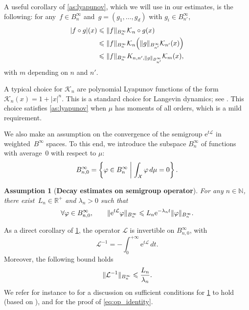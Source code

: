\documentclass[11pt]{article}
\newcommand{\R}{\mathbb{R}}
\newcommand{\N}{\mathbb{N}}
\newcommand{\e}{\mathrm{e}}
\renewcommand{\L}{\mathcal{L}}
\renewcommand{\leq}{\leqslant}
\DeclarePairedDelimiter\norm{\lVert}{\rVert}
\DeclarePairedDelimiter\paren{\lparen}{\rparen}
\newtheorem{assumption}{Assumption}
\theoremstyle{definition}
\newcommand{\Binfz}{B_{n,0}^{\infty}}
\begin{document}
A useful corollary of \cref{as:lyapunov}, which we will use in our estimates, is the following: for any~$f\in B^\infty_{n}$ and~$g = (g_1,\dotsc,g_d)$ with $g_i \in B^\infty_{n'}$, 
\begin{align}
\notag
	|f\circ g|(x) &\leq \|f\|_{B_{n}^\infty}\mathcal{K}_{n} \circ g(x) \\
	\notag
    &\leq \|f\|_{B_{n}^\infty}\mathcal{K}_{n}\paren*{\|g\|_{B^\infty_{n'}} \mathcal{K}_{n'}(x)} \\
    &\leq \norm{f}_{B^\infty_n}K_{n,n',\|g\|_{B^\infty_{n'}}}\mathcal{K}_{m}(x),
	\label{eq:lyap_composition_cor}
\end{align}
with $m$ depending on $n$ and $n'$.

A typical choice for $\mathcal{K}_n$ are polynomial Lyapunov functions of the form $\mathcal{K}_n(x) = 1+|x|^n$. This is a standard choice for Langevin dynamics; see \cite{mattingly2002,talay2002}. This choice satisfies \cref{as:lyapunov} when $\mu$ has moments of all orders, which is a mild requirement.

We also make an assumption on the convergence of the semigroup $\e^{t\L}$ in weighted~$B^\infty$ spaces. To this end, we introduce the subspace $B^\infty_n$ of functions with average~0 with respect to $\mu$:
\begin{equation}
\notag
    \Binfz = \left\{\varphi \in B^\infty_n \; \middle| \; \int_\mathcal{X} \varphi \, d\mu = 0\right\}.
\end{equation}

\begin{assumption}[{\bf Decay estimates on semigroup operator}]
  \label{as:decay_semigroup}
  For any $n\in\N$, there exist~$L_n \in \R^+$ and $\lambda_n>0$ such that
  \begin{equation}
    \forall \varphi\in \Binfz, \qquad \|\e^{t\L}\varphi\|_{B^\infty_n} \leq L_n\e^{-\lambda_n t}\norm{\varphi}_{B^\infty_n}.
    \label{eq:decay}
  \end{equation}
\end{assumption}

As a direct corollary of \cref{as:decay_semigroup}, the operator $\L$ is invertible on $\Binfz$, with
\begin{equation}
  \L^{-1} = -\int_0^{+\infty} \e^{t\L} \, dt.
  \label{eq:op_identity}
\end{equation}
Moreover, the following bound holds
\begin{equation}
\notag
  \norm{\L^{-1}}_{B^\infty_n} \leq \frac{L_n}{\lambda_n}.
\end{equation}
We refer for instance to \cite[Section 2]{lelievre2016} for a discussion on sufficient conditions for \cref{as:decay_semigroup} to hold (based on \cite{reybellet2006,hairer2011}), and for the proof of \eqref{eq:op_identity}.
\end{document}

